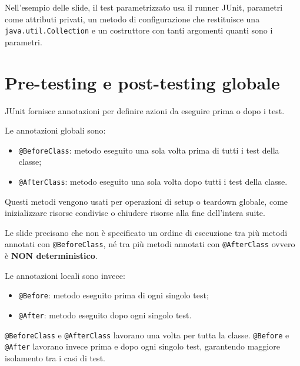 \begin{notaslide}
Nell'esempio delle slide, il test parametrizzato usa il runner JUnit, parametri come attributi privati, un metodo di configurazione che restituisce una \texttt{java.util.Collection} e un costruttore con tanti argomenti quanti sono i parametri.
\end{notaslide}

\section{Pre-testing e post-testing globale}

JUnit fornisce annotazioni per definire azioni da eseguire prima o dopo i test.

Le annotazioni globali sono:

\begin{itemize}
    \item \texttt{@BeforeClass}: metodo eseguito una sola volta prima di tutti i test della classe;
    \item \texttt{@AfterClass}: metodo eseguito una sola volta dopo tutti i test della classe.
\end{itemize}

Questi metodi vengono usati per operazioni di setup o teardown globale, come inizializzare risorse condivise o chiudere risorse alla fine dell'intera suite.

\begin{notaslide}
Le slide precisano che non è specificato un ordine di esecuzione tra più metodi annotati con \texttt{@BeforeClass}, né tra più metodi annotati con \texttt{@AfterClass} ovvero è \textbf{NON deterministico}.
\end{notaslide}

Le annotazioni locali sono invece:

\begin{itemize}
    \item \texttt{@Before}: metodo eseguito prima di ogni singolo test;
    \item \texttt{@After}: metodo eseguito dopo ogni singolo test.
\end{itemize}

\begin{notaprof}
\texttt{@BeforeClass} e \texttt{@AfterClass} lavorano una volta per tutta la classe. \texttt{@Before} e \texttt{@After} lavorano invece prima e dopo ogni singolo test, garantendo maggiore isolamento tra i casi di test.
\end{notaprof}

